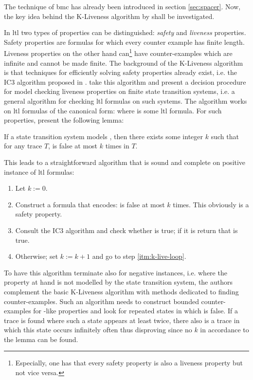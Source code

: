 The technique of \gls{bmc} has already been introduced in section \ref{sec:spacer}.
Now, the key idea behind the K-Liveness algorithm by \citeauthor{Claessen12} shall be investigated.

In \gls{ltl} two types of properties can be distinguished: \textit{safety} and \textit{liveness} properties.
Safety properties are formulas for which every counter example has finite length.
Liveness properties on the other hand can\footnote{%
    Especially, one has that every safety property is also a liveness property but not vice versa.
} have counter-examples which are infinite and cannot be made finite.
The background of the K-Liveness algorithm is that techniques for efficiently solving safety properties already exist, i.e. the IC3 algorithm proposed in \cite{Bradley11}.
\citeauthor{Claessen12} take this algorithm and present a decision procedure for model checking liveness properties on finite state transition systems, i.e. a general algorithm for checking \gls{ltl} formulas on such systems.
The algorithm works on \gls{ltl} formulas of the canonical form:  where  is some \gls{ltl} formula.
For such properties, \citeauthor{Claessen12} present the following lemma:
\begin{lemma}
    If a state transition system models , then there exists some integer $ k $ such that for any trace $ T $,  is false at most $ k $ times in $ T $.
\end{lemma}
This leads to a straightforward algorithm that is sound and complete on positive instance of \gls{ltl} formulas:
\begin{enumerate}
    \item Let $ k := 0 $.
    \item Construct a formula  that encodes:  is false at most $ k $ times. \label{itm:k-live-loop}
    This obviously is a safety property.
    \item Consult the IC3 algorithm and check whether  is true; if it is return that  is true.
    \item Otherwise; set $ k := k + 1 $ and go to step \ref{itm:k-live-loop}.
\end{enumerate}

To have this algorithm terminate also for negative instances, i.e. where the property at hand is not modelled by the state transition system, the authors complement the basic K-Liveness algorithm with methods dedicated to finding counter-examples.
Such an algorithm needs to construct bounded counter-examples for -like properties and look for repeated states in which  is false.
If a trace is found where such a state appears at least twice, there also is a trace in which this state occurs infinitely often thus disproving  since no $ k $ in accordance to the lemma can be found.

